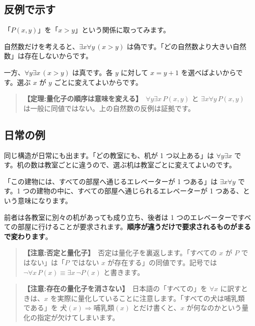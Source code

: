 \documentclass{article}
\begin{document}
\subsection{反例で示す}

「\(P(x, y)\)」を「\(x > y\)」という関係に取ってみます。

自然数だけを考えると、\(\exists x \forall y \, (x > y)\) は偽です。「どの自然数より大きい自然数」は存在しないからです。

一方、\(\forall y \exists x \, (x > y)\) は真です。各 \(y\) に対して \(x = y + 1\) を選べばよいからです。選ぶ \(x\) が \(y\) ごとに変えてよいからです。

\begin{quote}
\textbf{【定理:量化子の順序は意味を変える】}\ \(\forall y \exists x \, P(x, y)\) と \(\exists x \forall y \, P(x, y)\) は一般に同値ではない。上の自然数の反例は証拠です。
\end{quote}

\subsection{日常の例}

同じ構造が日常にも出ます。「どの教室にも、机が 1 つ以上ある」は \(\forall y \exists x\) です。机の数は教室ごとに違うので、選ぶ机は教室ごとに変えてよいのです。

「この建物には、すべての部屋へ通じるエレベーターが 1 つある」は \(\exists x \forall y\) です。1 つの建物の中に、すべての部屋へ通じられるエレベーターが 1 つある、という意味になります。

前者は各教室に別々の机があっても成り立ち、後者は 1 つのエレベーターですべての部屋に行けることが要求されます。\textbf{順序が違うだけで要求されるものがまるで変わります}。

\begin{quote}
\textbf{【注意:否定と量化子】}\ 否定は量化子を裏返します。「すべての \(x\) が \(P\) ではない」は「\(P\) ではない \(x\) が存在する」の同値です。記号では \(\neg \forall x \, P(x) \equiv \exists x \, \neg P(x)\) と書きます。
\end{quote}

\begin{quote}
\textbf{【注意:存在の量化子を消さない】}\ 日本語の「すべての」を \(\forall x\) に訳すときは、\(x\) を実際に量化していることに注意します。「すべての犬は哺乳類である」を \(\mathrm{犬}(x) \Rightarrow \mathrm{哺乳類}(x)\) とだけ書くと、\(x\) が何なのかという量化の指定が欠けてしまいます。
\end{quote}
\end{document}
